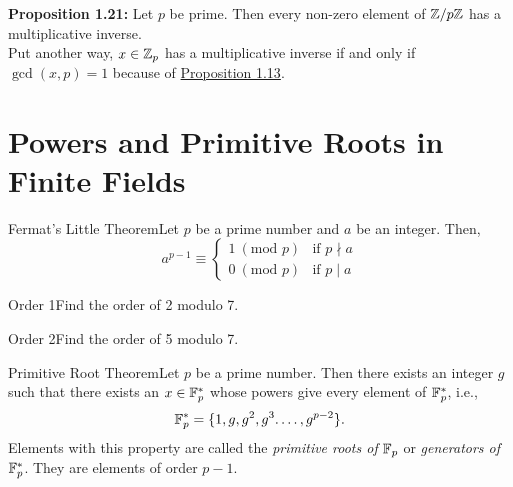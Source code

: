 \textbf{Proposition 1.21:} Let \(p\) be prime. Then every non-zero element of \(\mathbb{Z}/p\mathbb{Z}\) has a multiplicative inverse. \\

Put another way, \(x \in \mathbb{Z}_p\) has a multiplicative inverse if and only if \(\gcd(x,p) = 1\) because of \hyperlink{prop 1.13}{Proposition 1.13}. \\


\pfs%

\section{Powers and Primitive Roots in Finite Fields}
\hypertarget{thm:Fermat's Little Theorem}{}

\begin{theorem}
    {Fermat's Little Theorem}Let \(p\) be a prime number and \(a\) be an integer. Then, \[a^{p - 1} \equiv \begin{cases}
            1 \ (\text{mod } p) & \text{if } p \nmid a \\
            0 \ (\text{mod } p) & \text{if } p \mid a
        \end{cases}\]
\end{theorem}

\begin{example}
    {Order 1}Find the order of 2 modulo 7.
\end{example}


\begin{example}
    {Order 2}Find the order of 5 modulo 7.
\end{example}


\begin{theorem}
    {Primitive Root Theorem}Let \(p\) be a prime number. Then there exists an integer \(g\) such that there exists an \(x \in \mathbb{F}_p^*\) whose powers give every element of \(\mathbb{F}_p^*\), i.e., \[\mathbb{F}_p^* = \{1,g,g^2,g^3.\dots,g^{p - 2}\}.\] Elements with this property are called the \textit{primitive roots of} \(\mathbb{F}_p\) or \textit{generators of} \(\mathbb{F}_p^*\). They are elements of order \(p - 1\).
\end{theorem}

